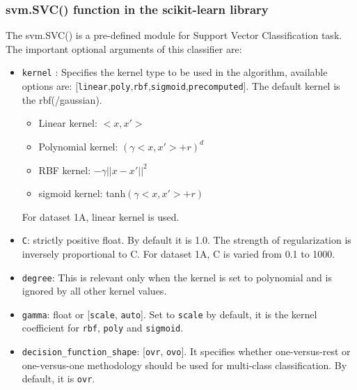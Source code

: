 \documentclass[11pt,a4paper]{article}
\newcommand{\noi}{\noindent}
\def\tt#1{\texttt{#1}}
\begin{document}
\subsubsection{svm.SVC() function in the scikit-learn library}\label{subsubsection:svm module}
The svm.SVC() is a pre-defined module for Support Vector Classification task. The important optional arguments of this classifier are: 
\begin{itemize}
    \item \tt{kernel} : Specifies the kernel type to be used in the algorithm, available options are: [\tt{linear},\tt{poly},\tt{rbf},\tt{sigmoid},\tt{precomputed}].
    The default kernel is the rbf(/gaussian). 
    \begin{itemize}
        \item Linear kernel: $<x,x'>$
        \item Polynomial kernel: $(\gamma<x,x'>+r)^{d}$
        \item RBF kernel: $-\gamma||x-x'||^{2}$
        \item sigmoid kernel: tanh$(\gamma<x,x'>+r)$
    \end{itemize} 

    \noi
    For dataset 1A, linear kernel is used. 
    \item \tt{C}: strictly positive float. By default it is 1.0. The strength of regularization is inversely proportional to C. For dataset 1A, C is varied from 0.1 to 1000. 
    \item \tt{degree}: This is relevant only when the kernel is set to polynomial and is ignored by all other kernel values.
    \item \tt{gamma}: float or [\tt{scale}, \tt{auto}]. Set to \tt{scale} by default, it is the kernel coefficient for \tt{rbf}, \tt{poly} and \tt{sigmoid}.
    \item \tt{decision\_function\_shape}: [\tt{ovr}, \tt{ovo}]. It specifies whether one-versus-rest or one-versus-one methodology should be used for multi-class classification. By default, it is \tt{ovr}. 
\end{itemize}
\end{document}
